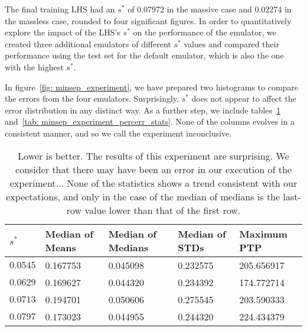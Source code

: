 The final training LHS had an $s^*$ of 0.07972 in the massive case and 
0.02274 in the massless case, rounded to four significant figures. In order
to quantitatively explore the impact of the LHS's $s^*$ on the performance
of the emulator, we created three additional emulators of different $s^*$
values and compared their performance using the test set for the default
emulator, which is also the one with the highest $s^*$.

In figure~\ref{fig: minsep_experiment}, we have prepared two histograms to
compare the errors from the four emulators. Surprisingly, $s^*$ does not
appear to affect the error distribution in any distinct way. As a further
step, we include tables~\ref{tab: minsep_experiment_delta_stats}
and~\ref{tab: minsep_experiment_percerr_stats}. None of the columns evolves
in a consistent manner, and so we call the experiment inconclusive.

\begin{table}[ht!]
\centering
\begin{tabular}{l|l|l|l|l}
\hline
$s^*$ & Median of Means & Median of Medians & Median of STDs & Maximum PTP \\ \hline
$0.0545$ & 0.167753 & 0.045098 & 0.232575 & 205.656917 \\
$0.0629$ & 0.169627 & 0.044320 & 0.234392 & 174.772714 \\
$0.0713$ & 0.194701 & 0.050606 & 0.275545 & 203.590333 \\
$0.0797$ & 0.173023 & 0.044955 & 0.244320 & 224.434379 \\
\end{tabular}
	\cprotect\caption[$s^*$ Experiment: Percent Error Statistics]{Lower is
		better. The
		results of this experiment are surprising. We consider that there
		may have been an error in our execution of the experiment...
		None of the statistics shows a trend consistent with our expectations,
		and only in the case of the median of medians is the last-row value
		lower than that of the first row.}
 \label{tab: minsep_experiment_delta_stats}
\end{table}

